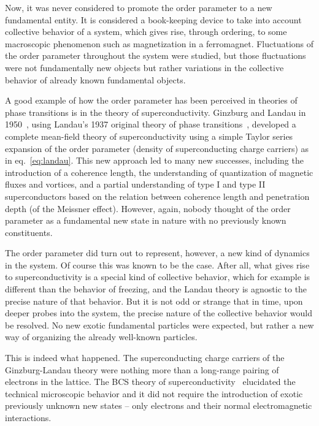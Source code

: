 \documentclass[letter,12pt]{article}
\begin{document}
Now, it was never considered to promote the order parameter to a new fundamental entity. It is considered a book-keeping device to take into account collective behavior of a system, which gives rise, through ordering, to some macroscopic phenomenon such as magnetization in a ferromagnet. Fluctuations of the order parameter throughout the system were studied, but those fluctuations were not fundamentally new objects but rather variations in the collective behavior of already known fundamental objects.

A good example of how the order parameter has been perceived in theories of phase transitions is in the theory of superconductivity.  Ginzburg and Landau in 1950~\cite{Ginzburg:1950}, using Landau's 1937 original theory of phase transitions~\cite{Landau:1937}, developed a complete mean-field theory of superconductivity using a simple Taylor series expansion of the order parameter (density of superconducting charge carriers) as in eq.~\ref{eq:landau}. This new approach led to many new successes, including the introduction of a coherence length, the understanding of quantization of magnetic fluxes and vortices, and a partial understanding of type I and type II superconductors based on the relation between coherence length and penetration depth (of the Meissner effect). However, again, nobody thought of the order parameter as a fundamental new state in nature with no previously known constituents.

The order parameter did turn out to represent, however, a new kind of dynamics in the system. Of course this was known to be the case. After all, what gives rise to superconductivity is a special kind of collective behavior, which for example is different than the behavior of freezing, and the Landau theory is agnostic to the precise nature of that behavior. But it is not odd or strange that in time, upon deeper probes into the system, the precise nature of the collective behavior would be resolved.  No new exotic fundamental particles were expected, but rather a new way of organizing the already well-known particles.

This is indeed what happened. The superconducting charge carriers of the Ginzburg-Landau theory were nothing more than a long-range pairing of electrons in the lattice. The BCS theory of superconductivity~\cite{BCS} elucidated the technical microscopic behavior and it did not require the introduction of exotic previously unknown new states -- only electrons and their normal electromagnetic interactions.
\end{document}

